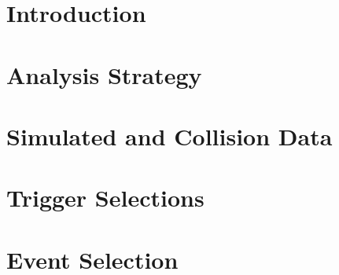 \documentclass[NOTE, atlasdraft=true, texlive=2016, UKenglish]{atlasdoc}
\begin{document}
\maketitle

\tableofcontents



\section{Introduction}
\label{sec:intro}



\section{Analysis Strategy}
\label{sec:strategy}



\section{Simulated and Collision Data}
\label{sec:data}



\section{Trigger Selections}
\label{sec:trigger}



\section{Event Selection}
\label{sec:selection}
\end{document}
